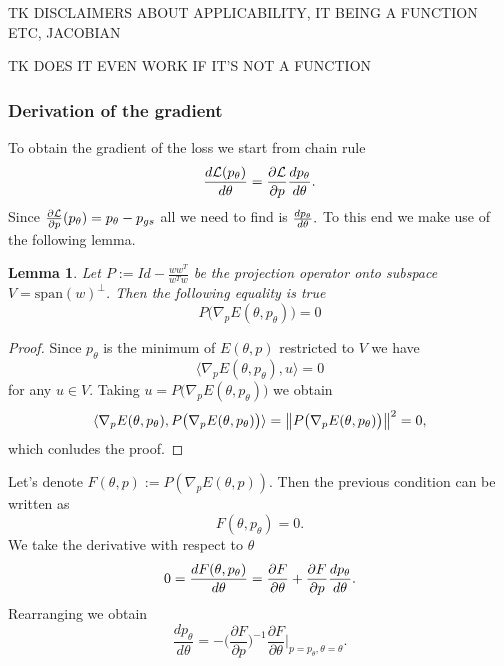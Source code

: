 \documentclass[a4paper,10pt]{report}
\newtheorem{lemma}{Lemma}
\begin{document}
TK DISCLAIMERS ABOUT APPLICABILITY, IT BEING A FUNCTION ETC, JACOBIAN

TK DOES IT EVEN WORK IF IT'S NOT A FUNCTION
\subsubsection{Derivation of the gradient}
To obtain the gradient of the loss we start from chain rule
\begin{equation}
 \frac{d\mathcal{L}(p_\theta)}{d \theta} = \frac{\partial \mathcal{L}}{\partial p}\frac{dp_\theta}{d \theta}.
\end{equation}
Since $\frac{\partial \mathcal{L}}{\partial p}(p_\theta )= p_\theta-p_{gs}$ all we need to find is $\frac{dp_\theta}{d \theta}.$ To this end we make use of the following lemma.

\begin{lemma}
 Let $P := Id -\frac{ww^T}{w^Tw} $ be the projection operator onto subspace $V = \text{span}(w)^{\perp}$. Then the following equality is true
 \begin{equation}
  P\big(\nabla_p E(\theta, p_\theta)\big) = 0
 \end{equation}

\end{lemma}

\begin{proof}
  Since $p_\theta$ is the minimum of $E(\theta,p)$ restricted to $V$ we have \[\langle \nabla_p E(\theta,p_{\theta}), u \rangle = 0\] for any $u\in V$. Taking $u = P\big( \nabla_p E(\theta,p_\theta)\big)$ we obtain
  \[\langle \nabla_p E(\theta,p_{\theta}), P\big( \nabla_p E(\theta,p_\theta)\big) \rangle = \left\|P\big( \nabla_p E(\theta,p_\theta)\big)\right\|^2=0,\]
  which conludes the proof.
\end{proof}

Let's denote $F(\theta,p) :=P (\nabla_p E(\theta,p)).$ Then the previous condition can be written as
\begin{equation}
 F(\theta,p_\theta) = 0.
\end{equation}
We take the derivative with respect to $\theta$
\begin{equation}
0=\frac{dF(\theta, p_\theta)}{d \theta} = \frac{\partial F}{\partial \theta} + \frac{\partial F}{\partial p} \frac{dp_\theta}{d \theta}.
\end{equation}
Rearranging we obtain
\begin{equation}
 \frac{d p_\theta}{d\theta} = - \bigg(\frac{\partial F}{\partial p}\bigg)^{-1}  \frac{\partial F}{\partial \theta}\bigg|_{p=p_\theta, \theta=\theta}.
\end{equation}
\end{document}

